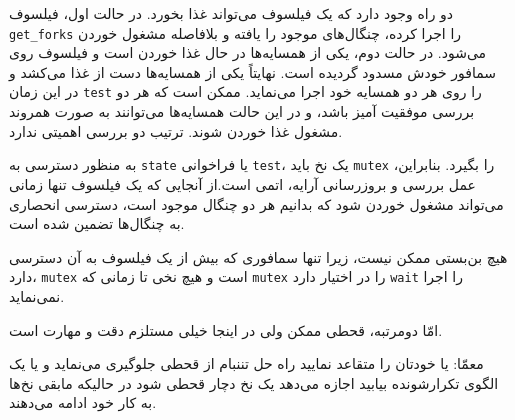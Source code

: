 \documentclass{book}
\begin{document}
    دو راه وجود دارد که یک فیلسوف می‌تواند غذا بخورد. در حالت اول، فیلسوف {\tt get\_forks} را اجرا کرده، چنگال‌های موجود را یافته و 
    بلافاصله مشغول خوردن می‌شود. در حالت دوم، یکی از همسایه‌ها در حال غذا خوردن است و فیلسوف روی سمافور خودش مسدود گردیده است. 
    نهایتاً یکی از همسایه‌ها دست از غذا می‌کشد و در این زمان  {\tt test} را روی هر دو همسایه خود اجرا می‌نماید. 
    ممکن است که هر دو بررسی موفقیت آمیز باشد، و در این حالت همسایه‌ها می‌توانند به صورت همروند مشغول غذا خوردن شوند. 
    ترتیب دو بررسی اهمیتی ندارد. 

    به منظور دسترسی به {\tt state} یا فراخوانی {\tt test}، یک نخ باید {\tt mutex} را بگیرد. 
    بنابراین، عمل بررسی و بروزرسانی آرایه، اتمی است.از آنجایی که یک فیلسوف تنها زمانی می‌تواند مشغول خوردن شود که بدانیم هر دو چنگال موجود است، 
    دسترسی انحصاری به چنگال‌ها تضمین شده است. 

    هیچ بن‌بستی ممکن نیست، زیرا تنها سمافوری که بیش از یک فیلسوف به آن دسترسی دارد، {\tt mutex} است و هیچ نخی  
    تا زمانی که {\tt mutex} را در اختیار دارد {\tt wait} را اجرا نمی‌نماید. 

    امّا دومرتبه، قحطی ممکن ولی در اینجا خیلی مستلزم دقت و مهارت است.

    معمّا: یا خودتان را متقاعد نمایید راه حل تننبام از قحطی جلوگیری می‌نماید و یا یک الگوی تکرارشونده بیابید اجازه می‌دهد یک نخ دچار قحطی شود 
    در حالیکه مابقی نخ‌ها به کار خود ادامه می‌دهند. 
\end{document}
